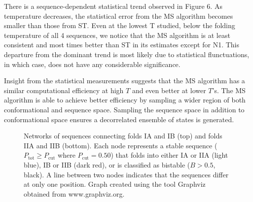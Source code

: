 \documentclass[
aip,
rsi,%
amsmath,amssymb,
reprint,%
]{revtex4-1}
\newcommand {\Pcut}     	{{P_\mathrm{cut}}}
\newcommand {\Ptot}	{{P_\mathrm{tot}}}
\begin{document}
There is a sequence-dependent statistical trend observed in Figure 6. As temperature decreases, the statistical error from the MS algorithm becomes smaller than those from ST. Even at the lowest T studied, below the folding temperature of all 4 sequences, we notice that the MS algorithm is at least consistent and most times better than ST in its estimates except for N1. This departure from the dominant trend is most likely due to statistical flunctuations, in which case, does not have any considerable significance.

Insight from the statistical measurements suggests that the MS algorithm has a similar computational efficiency at high $T$ and even better at lower $T$'s. The MS algorithm is able to achieve  better efficiency by sampling a wider region of both conformational and sequence space. Sampling the sequence space in addition to conformational space ensures a decorrelated ensemble of states is generated.

\begin{figure}
\caption{Networks of sequences connecting folds IA and IB (top) and folds IIA and IIB (bottom). Each node represents a stable sequence ($\Ptot\ge\Pcut$ where $\Pcut=0.50$) that folds into either IA or IIA (light blue), IB or IIB (dark red), or is classified as bistable ($B>0.5$, black). A line between two nodes indicates that the sequences differ at only one position. Graph created using the tool Graphviz~\protect\cite{Graphviz2000} obtained from  www.graphviz.org.}
\end{figure}
\end{document}
